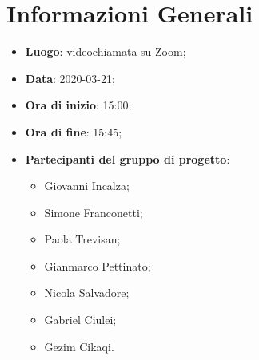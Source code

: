 \section{Informazioni Generali}
	\begin{itemize}
		\item \textbf {Luogo}: videochiamata su Zoom;
		\item \textbf {Data}: 2020-03-21;
		\item \textbf {Ora di inizio}: 15:00;
		\item \textbf {Ora di fine}: 15:45;
		\item \textbf {Partecipanti del gruppo di progetto}:
			\begin{itemize}
				\item Giovanni Incalza;
				\item Simone Franconetti;
				\item Paola Trevisan;
				\item Gianmarco Pettinato;
				\item Nicola Salvadore;
				\item Gabriel Ciulei;
				\item Gezim Cikaqi.
			\end{itemize}
	\end{itemize}
